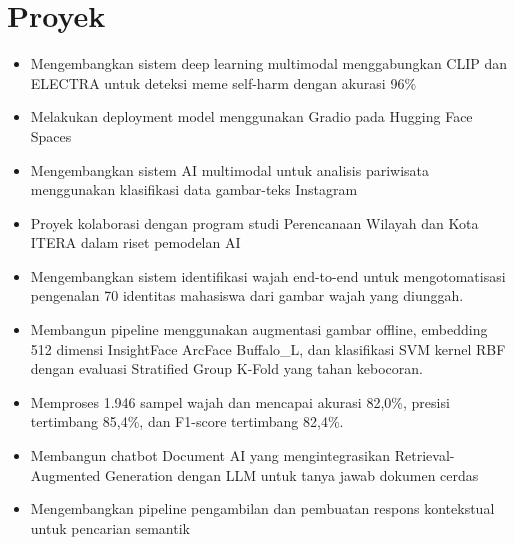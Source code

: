 \section*{Proyek}
\begin{itemize}
  \item Mengembangkan sistem deep learning multimodal menggabungkan CLIP dan ELECTRA untuk deteksi meme self-harm  dengan akurasi 96\%
  \item Melakukan deployment model menggunakan Gradio pada Hugging Face Spaces
\end{itemize}

\begin{itemize}
  \item Mengembangkan sistem AI multimodal untuk analisis pariwisata menggunakan klasifikasi data gambar-teks Instagram
  \item Proyek kolaborasi dengan program studi Perencanaan Wilayah dan Kota ITERA dalam riset pemodelan AI
\end{itemize}

\begin{itemize}
  \item Mengembangkan sistem identifikasi wajah end-to-end untuk mengotomatisasi pengenalan 70 identitas mahasiswa dari gambar wajah yang diunggah.
  \item Membangun pipeline menggunakan augmentasi gambar offline, embedding 512 dimensi InsightFace ArcFace Buffalo\_L, dan klasifikasi SVM kernel RBF dengan evaluasi Stratified Group K-Fold yang tahan kebocoran.
  \item Memproses 1.946 sampel wajah dan mencapai akurasi 82,0\%, presisi tertimbang 85,4\%, dan F1-score tertimbang 82,4\%.
\end{itemize}

\begin{itemize}
  \item Membangun chatbot Document AI yang mengintegrasikan Retrieval-Augmented Generation dengan LLM untuk tanya jawab dokumen cerdas
  \item Mengembangkan pipeline pengambilan dan pembuatan respons kontekstual untuk pencarian semantik
\end{itemize}

